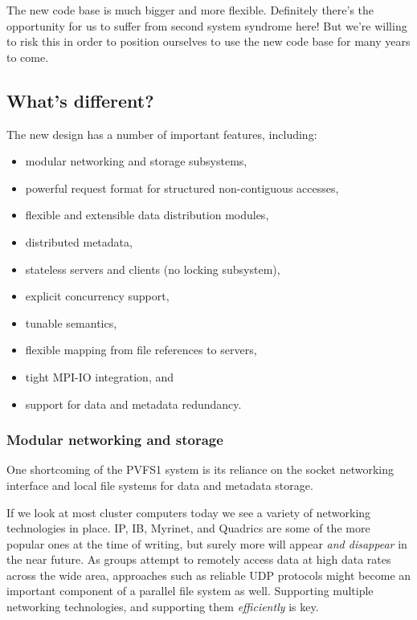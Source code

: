 The new code base is much bigger and more flexible.  Definitely there's the
opportunity for us to suffer from second system syndrome here!  But we're
willing to risk this in order to position ourselves to use the new code base
for many years to come.

\subsection{What's different?}

The new design has a number of important features, including:
\begin{itemize}
\item modular networking and storage subsystems,
\item powerful request format for structured non-contiguous accesses,
\item flexible and extensible data distribution modules,
\item distributed metadata,
\item stateless servers and clients (no locking subsystem),
\item explicit concurrency support,
\item tunable semantics,
\item flexible mapping from file references to servers,
\item tight MPI-IO integration, and
\item support for data and metadata redundancy.
\end{itemize}

\subsubsection{Modular networking and storage}

One shortcoming of the PVFS1 system is its reliance on the socket networking
interface and local file systems for data and metadata storage.

If we look at most cluster computers today we see a variety of networking
technologies in place.  IP, IB, Myrinet, and Quadrics are some of the more
popular ones at the time of writing, but surely more will appear \emph{and
disappear} in the near future.
%
As groups attempt to remotely access data at high data rates across the wide
area, approaches such as reliable UDP protocols might become an important
component of a parallel file system as well.
%
Supporting multiple networking technologies, and supporting them
\emph{efficiently} is key.

